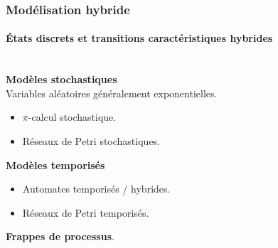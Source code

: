 \begin{frame}
\frametitle{Modélisation hybride}
\framesubtitle{\'Etats discrets et transitions caractéristiques hybrides}

\\
\medskip
\textbf{Modèles stochastiques} \\
Variables aléatoires généralement exponentielles. 
\begin{itemize}
 \item $\pi$-calcul stochastique. 
 \item Réseaux de Petri stochastiques.
\end{itemize}
%  


\bigskip

\textbf{Modèles temporisés}
\begin{itemize}
 \item Automates temporisés / hybrides.
 \item Réseaux de Petri temporisés.
\end{itemize}

\medskip

\textbf{Frappes de processus}.
% 



\end{frame}


